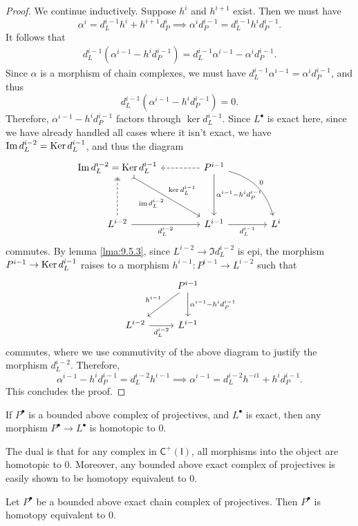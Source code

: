 \begin{proof}
	We continue inductively. Suppose $h^i$ and $h^{i+1} $ exist. Then we must have
	\[
		\alpha ^i=d_L^{i-1} h^i+h^{i+1} d_P^i\implies \alpha ^id_P^{i-1} =d_L^{i-1} h^id_P^{i-1} 
	.\]
	It follows that
	\begin{align*}
		d_L^{i-1} \left( \alpha ^{i-1} -h^id_P^{i-1}  \right) =d_L^{i-1} \alpha ^{i-1} -\alpha ^id_P^{i-1} 
	.\end{align*}
	Since $\alpha $ is a morphism of chain complexes, we must have $d_L^{i-1} \alpha ^{i-1} =\alpha ^{i} d_P^{i-1} $, and thus
	\[
		d_L^{i-1} \left( \alpha ^{i-1} -h^id_P^{i-1}  \right) =0
	.\]
	Therefore, $\alpha ^{i-1} -h^id_P^{i-1} $ factors through $\ker d_L^{i-1} $. Since $L^{\bullet} $ is exact here, since we have already handled all cases where it isn't exact, we have $\operatorname{Im} d_L^{i-2} =\operatorname{Ker} d_L^{i-1} $, and thus the diagram
	\[\begin{tikzcd}[row sep = 4em, column sep = 4em]
		\Im d_L^{i-2} =\Ker d_L^{i-1} \ar[dr, tail, "\ker d_L^{i-1} ", "\im d_L^{i-2} "']&P^{i-1} \ar[l, dashed]\ar[d, "\alpha ^{i-1} -h^id_P^{i-1} "]\ar[dr, bend left, "0"]\\
		L^{i-2} \ar[u, two heads, dashed]\ar[r, "d_L^{i-2} "']&L^{i-1} \ar[r, "d_L^{i-1} "']&L^i
	\end{tikzcd}\]
	commutes. By lemma \ref{lma:9.5.3}, since $L^{i-2} \to \Im d_L^{i-2} $ is epi, the morphism $P^{i-1} \to \operatorname{Ker} d_L^{i-1} $ raises to a morphism $h^{i-1} : P^{i-1}  \to L^{i-2} $ such that
	\[\begin{tikzcd}[row sep = 2.5em, column sep = 2.5em]
		&P^{i-1} \ar[dl, "h^{i-1} "']\ar[d, "\alpha ^{i-1} -h^{i} d_P^{i-1} "]\\
		L^{i-2} \ar[r, "d_L^{i-2} "']&L^{i-1} 
	\end{tikzcd}\]
	commutes, where we use commutivity of the above diagram to justify the morphism $d_L^{i-2} $. Therefore,
	\[
		\alpha ^{i-1} -h^id_P^{i-1} =d_L^{i-2} h^{i-1} \implies \alpha ^{i-1} =d_L^{i-2} h^{-i1} +h^{i} d_P^{i-1} 
	.\]
	This concludes the proof.
\end{proof}
\begin{corollary}\label{cor:9.5.1}
	If $P^{\bullet} $ is a bounded above complex of projectives, and $L^{\bullet} $ is exact, then any morphism $P^{\bullet} \to L^{\bullet} $ is homotopic to $0$.
\end{corollary}

The dual is that for any complex in $\mathsf{C}^+(\mathsf{I} )$, all morphisms into the object are homotopic to 0. Moreover, any bounded above exact complex of projectives is easily shown to be homotopy equivalent to 0.
\begin{corollary}\label{cor:9.5.2}
	Let $P^{\bullet} $ be a bounded above exact chain complex of projectives. Then $P^{\bullet} $ is homotopy equivalent to 0.
\end{corollary}


